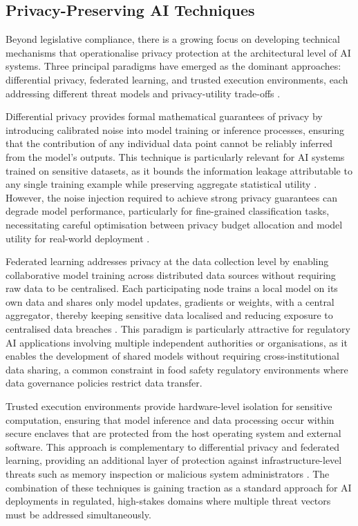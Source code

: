 \hypertarget{privacy-preserving-ai-techniques}{%
\subsection{Privacy-Preserving AI Techniques}\label{privacy-preserving-ai-techniques}}

Beyond legislative compliance, there is a growing focus on developing technical mechanisms that operationalise privacy protection at the architectural level of AI systems. Three principal paradigms have emerged as the dominant approaches: differential privacy, federated learning, and trusted execution environments, each addressing different threat models and privacy-utility trade-offs \parencite{zuzanna_fendor_276ddcba}.

Differential privacy provides formal mathematical guarantees of privacy by introducing calibrated noise into model training or inference processes, ensuring that the contribution of any individual data point cannot be reliably inferred from the model's outputs. This technique is particularly relevant for AI systems trained on sensitive datasets, as it bounds the information leakage attributable to any single training example while preserving aggregate statistical utility \parencite{reihaneh_torkzadehmahani_ed6428e5}. However, the noise injection required to achieve strong privacy guarantees can degrade model performance, particularly for fine-grained classification tasks, necessitating careful optimisation between privacy budget allocation and model utility for real-world deployment \parencite{ramit_sehgal_7100e259}.

Federated learning addresses privacy at the data collection level by enabling collaborative model training across distributed data sources without requiring raw data to be centralised. Each participating node trains a local model on its own data and shares only model updates, gradients or weights, with a central aggregator, thereby keeping sensitive data localised and reducing exposure to centralised data breaches \parencite{kilian_sprenkamp_729804de}. This paradigm is particularly attractive for regulatory AI applications involving multiple independent authorities or organisations, as it enables the development of shared models without requiring cross-institutional data sharing, a common constraint in food safety regulatory environments where data governance policies restrict data transfer.

Trusted execution environments provide hardware-level isolation for sensitive computation, ensuring that model inference and data processing occur within secure enclaves that are protected from the host operating system and external software. This approach is complementary to differential privacy and federated learning, providing an additional layer of protection against infrastructure-level threats such as memory inspection or malicious system administrators \parencite{haochen_liu_f33409d1}. The combination of these techniques is gaining traction as a standard approach for AI deployments in regulated, high-stakes domains where multiple threat vectors must be addressed simultaneously.

